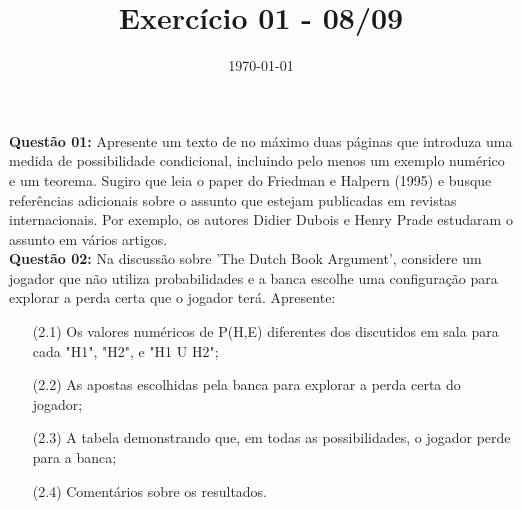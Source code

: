\documentclass[a4paper]{article}
\date{\today}
\title{Exercício 01 - 08/09}
\begin{document}
    \header{}

\textbf{Questão 01:} Apresente um texto de no máximo duas páginas que introduza uma medida de possibilidade condicional, incluindo pelo menos um exemplo numérico e um teorema. Sugiro que leia o paper do Friedman e Halpern (1995) e busque referências adicionais sobre o assunto que estejam publicadas em revistas internacionais. Por exemplo, os autores Didier Dubois e Henry Prade estudaram o assunto em vários artigos. \\[0.5cm]
\textbf{Questão 02:} Na discussão sobre 'The Dutch Book Argument', considere um jogador que não utiliza probabilidades e a banca escolhe uma configuração para explorar a perda certa que o jogador terá. Apresente:
\begin{center}
\begin{itemize}
  \item[(2.1)] Os valores numéricos de P(H,E) diferentes dos discutidos em sala para cada "H1", "H2", e "H1 U H2";
  \item[(2.2)] As apostas escolhidas pela banca para explorar a perda certa do jogador;
  \item[(2.3)] A tabela demonstrando que, em todas as possibilidades, o jogador perde para a banca;
  \item[(2.4)] Comentários sobre os resultados.
\end{itemize}
\end{center}
\end{document}
